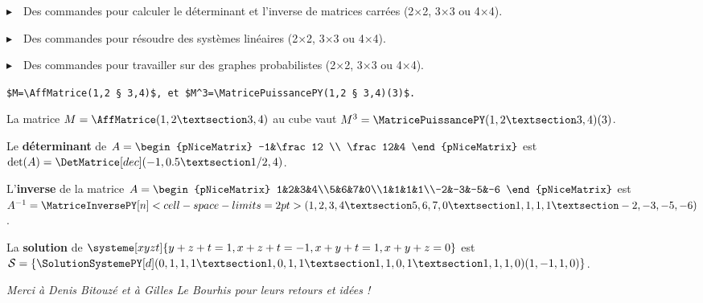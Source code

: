 \documentclass[french,a4paper,11pt]{article}
\begin{document}
\smallskip

{$\blacktriangleright$~~Des commandes pour calculer le déterminant et l'inverse de matrices carrées (2×2, 3×3 ou 4×4).}

\smallskip

{$\blacktriangleright$~~Des commandes pour résoudre des systèmes linéaires (2×2, 3×3 ou 4×4).}

\smallskip

{$\blacktriangleright$~~Des commandes pour travailler sur des graphes probabilistes (2×2, 3×3 ou 4×4).}

\vspace{1cm}

\begin{center}
	\begin{tcolorbox}[enhanced,colframe=ForestGreen,colback=lightgray!5,center,width=0.95\linewidth,drop fuzzy shadow=lightgray]
	\verb|$M=\AffMatrice(1,2 § 3,4)$, et $M^3=\MatricePuissancePY(1,2 § 3,4)(3)$.|
	
	\medskip
	
	La matrice $M=\AffMatrice(1,2 § 3,4)$ au cube vaut $M^3=\MatricePuissancePY(1,2 § 3,4)(3)$.
	
	Le \textbf{déterminant} de $A=\begin{pNiceMatrix} -1&\frac12 \\ \frac12&4 \end{pNiceMatrix}$ est
	$\det(A)=\DetMatrice[dec](-1,0.5 § 1/2,4)$.
	
	\medskip
	
	L'\textbf{inverse} de la matrice $A=\begin{pNiceMatrix} 1&2&3&4\\5&6&7&0\\1&1&1&1\\-2&-3&-5&-6 \end{pNiceMatrix}$ est $A^{-1}=\MatriceInversePY[n]<cell-space-limits=2pt>(1,2,3,4 § 5,6,7,0 § 1,1,1,1 § -2,-3,-5,-6)$.
	
	\medskip
	
	La \textbf{solution} de $\systeme[xyzt]{y+z+t=1,x+z+t=-1,x+y+t=1,x+y+z=0}$ est $\mathcal{S}=\left\lbrace\SolutionSystemePY[d](0,1,1,1 § 1,0,1,1 § 1,1,0,1 § 1,1,1,0)(1,-1,1,0)\right\rbrace$.
	\end{tcolorbox}
\end{center}

\vspace{0.5cm}

\hfill{}\textit{Merci à Denis Bitouzé et à Gilles Le Bourhis pour leurs retours et idées !}
\end{document}
